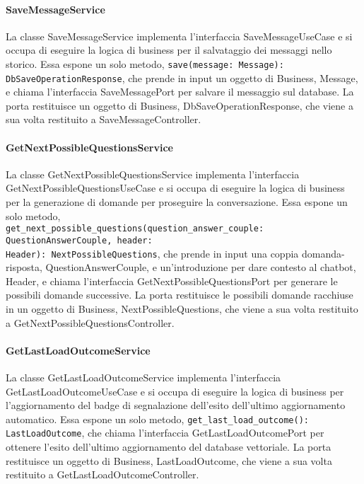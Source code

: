\paragraph{SaveMessageService}
\label{sec:save_message_service}
La classe SaveMessageService implementa l'interfaccia SaveMessageUseCase e si occupa di eseguire la logica di business per il salvataggio dei messaggi nello storico. Essa espone un solo metodo, \texttt{save(message: Message): DbSaveOperationResponse}, che prende in input un oggetto di Business, Message, e chiama l'interfaccia SaveMessagePort per salvare il messaggio sul database. La porta restituisce un oggetto di Business, DbSaveOperationResponse, che viene a sua volta restituito a SaveMessageController.

\paragraph{GetNextPossibleQuestionsService}
\label{sec:get_next_possible_questions_service}
La classe GetNextPossibleQuestionsService implementa l'interfaccia GetNextPossibleQuestionsUseCase e si occupa di eseguire la logica di business per la generazione di domande per proseguire la conversazione. Essa espone un solo metodo,\\ \texttt{get\_next\_possible\_questions(question\_answer\_couple: QuestionAnswerCouple, header:\\ Header): NextPossibleQuestions}, che prende in input una coppia domanda-risposta, QuestionAnswerCouple, e un'introduzione per dare contesto al chatbot, Header, e chiama l'interfaccia GetNextPossibleQuestionsPort per generare le possibili domande successive. La porta restituisce le possibili domande racchiuse in un oggetto di Business, NextPossibleQuestions, che viene a sua volta restituito a GetNextPossibleQuestionsController.

\paragraph{GetLastLoadOutcomeService}
\label{sec:get_last_load_outcome_service}
La classe GetLastLoadOutcomeService implementa l'interfaccia GetLastLoadOutcomeUseCase e si occupa di eseguire la logica di business per l'aggiornamento del badge di segnalazione dell'esito dell'ultimo aggiornamento automatico. Essa espone un solo metodo, \texttt{get\_last\_load\_outcome(): LastLoadOutcome}, che chiama l'interfaccia GetLastLoadOutcomePort per ottenere l'esito dell'ultimo aggiornamento del database vettoriale. La porta restituisce un oggetto di Business, LastLoadOutcome, che viene a sua volta restituito a GetLastLoadOutcomeController.

